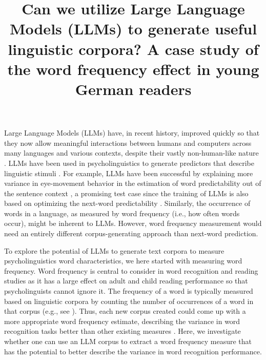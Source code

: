 \documentclass[doc, a4paper]{apa7}
\title{Can we utilize Large Language Models (LLMs) to generate useful linguistic corpora? A case study of the word frequency effect in young German readers}
\begin{document}
\maketitle

Large Language Models (LLMs) have, in recent history, improved quickly so that they now allow meaningful interactions between humans and computers across many languages \citep{chang_when_2023, lai_chatgpt_2023} and various contexts, despite their vastly non-human-like nature \citep{min_recent_2021, singhal_large_2023, kasneci_chatgpt_2023}. LLMs have been used in psycholinguistics to generate predictors that describe linguistic stimuli \citep{trott_can_2024}. For example, LLMs have been successful by explaining more variance in eye-movement behavior in the estimation of word predictability out of the sentence context \citep{hofmann_language_2022, chandra_synthetic_2023, heilbron_prediction_2021}, a promising test case since the training of LLMs is also based on optimizing the next-word predictability \citep{tay2022efficienttransformerssurvey}.  Similarly, the occurrence of words in a language, as measured by word frequency (i.e., how often words occur), might be inherent to LLMs. However, word frequency measurement would need an entirely different corpus-generating approach than next-word prediction.

To explore the potential of LLMs to generate text corpora to measure psycholinguistics word characteristics, we here started with measuring word frequency. Word frequency is central to consider in word recognition and reading studies as it has a large effect on adult and child reading performance \cite{brysbaert_impact_2016,brysbaert_word_2018,gregorova_access_2023,schroter_developmental_2017, kliegl_length_2004,hawelka_dual-route_2010} so that psycholinguists cannot ignore it. The frequency of a word is typically measured based on linguistic corpora by counting the number of occurrences of a word in that corpus (e.g., see \cite{brysbaert_word_2011,baayen_celex_1993,schroeder_childlex_2015,heister_dlexdb_2011}). Thus, each new corpus created could come up with a more appropriate word frequency estimate, describing the variance in word recognition tasks better than other existing measures \cite{brysbaert_word_2011}. Here, we investigate whether one can use an LLM corpus to extract a word frequency measure that has the potential to better describe the variance in word recognition performance. 
\end{document}
